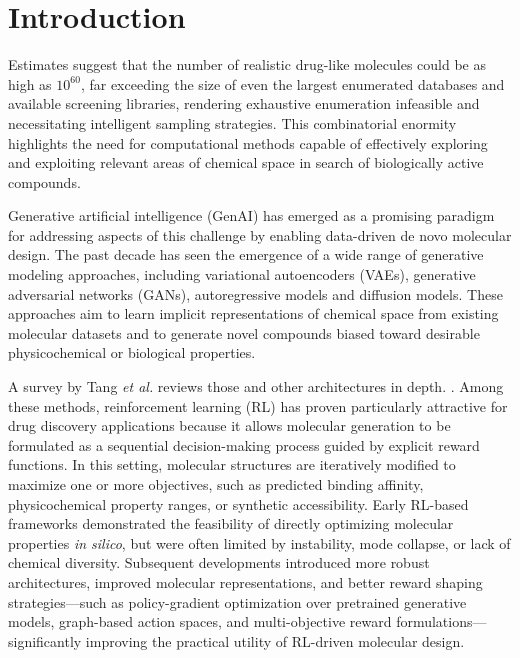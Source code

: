 \documentclass[letterpaper]{article}
\begin{document}
\section{Introduction}
Estimates suggest that the number of realistic drug-like molecules could be as high as $10^{60}$, far exceeding the size of even the largest enumerated databases and available screening libraries, rendering exhaustive enumeration infeasible and necessitating intelligent sampling strategies\cite{Bohacek1996ThePerspective,Polishchuk2013EstimationData,Walters2019VirtualLibraries}. This combinatorial enormity highlights the need for computational methods capable of effectively exploring and exploiting relevant areas of chemical space in search of biologically active compounds.

Generative artificial intelligence (GenAI) has emerged as a promising paradigm for addressing aspects of this challenge by enabling data-driven de novo molecular design. The past decade has seen the emergence of a wide range of generative modeling approaches, including variational autoencoders (VAEs)\cite{Gomez-Bombarelli2018AutomaticMolecules,Oliveira2022MolecularAutoencoder,Ochiai2023VariationalComplexity},
generative adversarial networks (GANs)\cite{Lee2021GenerativeDesign,Macedo2024MedGAN:Design,Sun2025GenerativeChallenges,Xu2025GenerationNetworks},
autoregressive models\cite{Segler2017GeneratingNetworks,Gebauer2022InverseNetworks} and  
diffusion models\cite{Morehead2024Geometry-completeOptimization}. These approaches aim to learn implicit representations of chemical space from existing molecular datasets and to generate novel compounds biased toward desirable physicochemical or biological properties.

A survey by Tang \textit{et al.} reviews those and other architectures in depth.
\cite{Tang2024AGeneration}. Among these methods, reinforcement learning (RL) has proven particularly attractive for drug discovery applications because it allows molecular generation to be formulated as a sequential decision-making process guided by explicit reward functions. In this setting, molecular structures are iteratively modified to maximize one or more objectives, such as predicted binding affinity, physicochemical property ranges, or synthetic accessibility. Early RL-based frameworks demonstrated the feasibility of directly optimizing molecular properties \textit{in silico}, but were often limited by instability, mode collapse, or lack of chemical diversity\cite{Walters2020AssessingChemistry}. Subsequent developments introduced more robust architectures, improved molecular representations, and better reward shaping strategies—such as policy-gradient optimization over pretrained generative models, graph-based action spaces, and multi-objective reward formulations—significantly improving the practical utility of RL-driven molecular design\cite{Olivecrona2017MolecularLearning,Zhou2019OptimizationLearning,Blaschke2020Memory-assistedDesign}.
\end{document}
